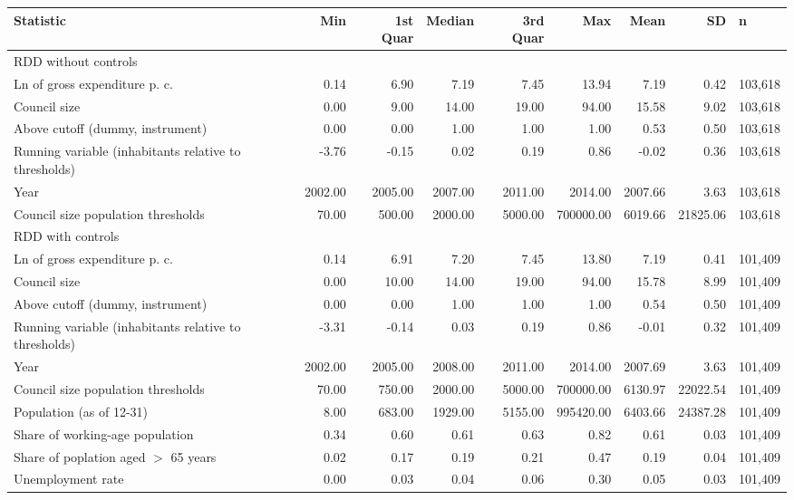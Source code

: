 \begin{tabular}{lrrrrrrrl}
  \toprule
Statistic & Min & 1st Quar & Median & 3rd Quar & Max & Mean & SD & n \\ 
  \midrule
RDD without controls &  &  &  &  &  &  &  &  \\ 
  Ln of gross expenditure p. c. & 0.14 & 6.90 & 7.19 & 7.45 & 13.94 & 7.19 & 0.42 & 103,618 \\ 
  Council size & 0.00 & 9.00 & 14.00 & 19.00 & 94.00 & 15.58 & 9.02 & 103,618 \\ 
  Above cutoff (dummy, instrument) & 0.00 & 0.00 & 1.00 & 1.00 & 1.00 & 0.53 & 0.50 & 103,618 \\ 
  Running variable (inhabitants relative to thresholds) & -3.76 & -0.15 & 0.02 & 0.19 & 0.86 & -0.02 & 0.36 & 103,618 \\ 
  Year & 2002.00 & 2005.00 & 2007.00 & 2011.00 & 2014.00 & 2007.66 & 3.63 & 103,618 \\ 
  Council size population thresholds & 70.00 & 500.00 & 2000.00 & 5000.00 & 700000.00 & 6019.66 & 21825.06 & 103,618 \\ 
  RDD with controls &  &  &  &  &  &  &  &  \\ 
  Ln of gross expenditure p. c. & 0.14 & 6.91 & 7.20 & 7.45 & 13.80 & 7.19 & 0.41 & 101,409 \\ 
  Council size & 0.00 & 10.00 & 14.00 & 19.00 & 94.00 & 15.78 & 8.99 & 101,409 \\ 
  Above cutoff (dummy, instrument) & 0.00 & 0.00 & 1.00 & 1.00 & 1.00 & 0.54 & 0.50 & 101,409 \\ 
  Running variable (inhabitants relative to thresholds) & -3.31 & -0.14 & 0.03 & 0.19 & 0.86 & -0.01 & 0.32 & 101,409 \\ 
  Year & 2002.00 & 2005.00 & 2008.00 & 2011.00 & 2014.00 & 2007.69 & 3.63 & 101,409 \\ 
  Council size population thresholds & 70.00 & 750.00 & 2000.00 & 5000.00 & 700000.00 & 6130.97 & 22022.54 & 101,409 \\ 
  Population (as of 12-31) & 8.00 & 683.00 & 1929.00 & 5155.00 & 995420.00 & 6403.66 & 24387.28 & 101,409 \\ 
  Share of working-age population & 0.34 & 0.60 & 0.61 & 0.63 & 0.82 & 0.61 & 0.03 & 101,409 \\ 
  Share of poplation aged $>$ 65 years & 0.02 & 0.17 & 0.19 & 0.21 & 0.47 & 0.19 & 0.04 & 101,409 \\ 
  Unemployment rate & 0.00 & 0.03 & 0.04 & 0.06 & 0.30 & 0.05 & 0.03 & 101,409 \\ 

\end{tabular}
